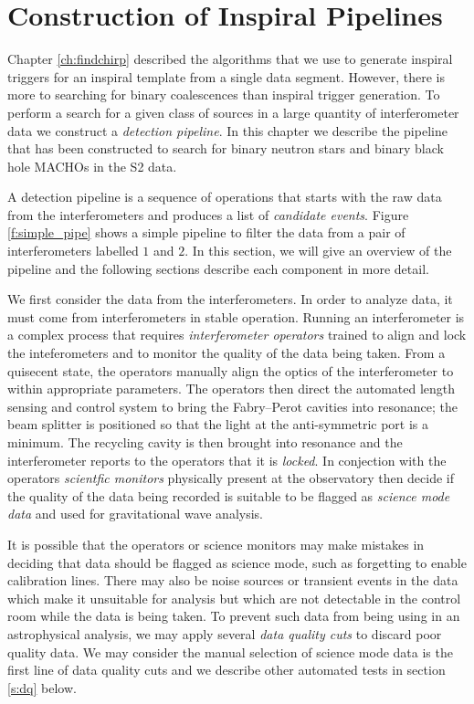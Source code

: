 
\section{Construction of Inspiral Pipelines}
\label{s:construction}

Chapter \ref{ch:findchirp} described the algorithms that we use to generate
inspiral triggers for an inspiral template from a single data segment.
However, there is more to searching for binary coalescences than inspiral
trigger generation. To perform a search for a given class of sources in a
large quantity of interferometer data we construct a \emph{detection
pipeline}. In this chapter we describe the pipeline that has been constructed
to search for binary neutron stars and binary black hole MACHOs in the S2
data.

A detection pipeline is a sequence of operations that starts with the raw data
from the interferometers and produces a list of \emph{candidate events}.
Figure \ref{f:simple_pipe} shows a simple pipeline to filter the data from a
pair of interferometers labelled $1$ and $2$. In this section, we will give an
overview of the pipeline and the following sections describe each component in
more detail. 

We first consider the data from the interferometers. In order to analyze
data, it must come from interferometers in stable operation. Running an
interferometer is a complex process that requires \emph{interferometer
operators} trained to align and lock the inteferometers and to monitor the
quality of the data being taken. From a quisecent state, the operators
manually align the optics of the interferometer to within appropriate
parameters. The operators then direct the automated length sensing and control
system to bring the Fabry--Perot cavities into resonance; the beam splitter
is positioned so that the light at the anti-symmetric port is a minimum. The
recycling cavity is then brought into resonance and the interferometer reports
to the operators that it is \emph{locked}.  In conjection with the operators
\emph{scientfic monitors} physically present at the observatory then decide if
the quality of the data being recorded is suitable to be flagged as
\emph{science mode data} and used for gravitational wave analysis.

It is possible that the operators or science monitors may make mistakes in
deciding that data should be flagged as science mode, such as forgetting to
enable calibration lines. There may also be noise sources or transient events
in the data which make it unsuitable for analysis but which are not detectable
in the control room while the data is being taken. To prevent such data from
being using in an astrophysical analysis, we may apply several \emph{data
quality cuts} to discard poor quality data. We may consider the manual
selection of science mode data is the first line of data quality cuts and we
describe other automated tests in section \ref{s:dq} below.

